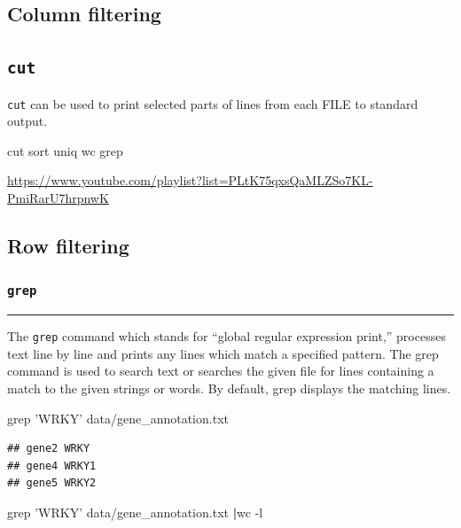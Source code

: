 \documentclass[]{book}
\makeatletter
\newenvironment{Shaded}{\begin{snugshade}}{\end{snugshade}}
\newcommand{\FunctionTok}[1]{\textcolor[rgb]{0.00,0.00,0.00}{#1}}
\newcommand{\KeywordTok}[1]{\textcolor[rgb]{0.13,0.29,0.53}{\textbf{#1}}}
\newcommand{\NormalTok}[1]{#1}
\newcommand{\StringTok}[1]{\textcolor[rgb]{0.31,0.60,0.02}{#1}}
\newenvironment{kframe}{%
\medskip{}
\setlength{\fboxsep}{.8em}
 \def\at@end@of@kframe{}%
 \ifinner\ifhmode%
  \def\at@end@of@kframe{\end{minipage}}%
  \begin{minipage}{\columnwidth}%
 \fi\fi%
 \def\FrameCommand##1{\hskip\@totalleftmargin \hskip-\fboxsep
 \colorbox{shadecolor}{##1}\hskip-\fboxsep
     \hskip-\linewidth \hskip-\@totalleftmargin \hskip\columnwidth}%
 \MakeFramed {\advance\hsize-\width
   \@totalleftmargin\z@ \linewidth\hsize
   \@setminipage}}%
 {\par\unskip\endMakeFramed%
 \at@end@of@kframe}
\renewenvironment{Shaded}{\begin{kframe}}{\end{kframe}}
\makeatother
\begin{document}
\hypertarget{column-filtering}{%
\subsection{Column filtering}\label{column-filtering}}

\hypertarget{cut}{%
\subsection{\texorpdfstring{\texttt{cut}}{cut}}\label{cut}}

\texttt{cut} can be used to print selected parts of lines from each FILE to standard output.

cut sort uniq wc grep

\url{https://www.youtube.com/playlist?list=PLtK75qxsQaMLZSo7KL-PmiRarU7hrpnwK}

\hypertarget{row-filtering}{%
\subsection{Row filtering}\label{row-filtering}}

\hypertarget{grep}{%
\subsubsection{\texorpdfstring{\texttt{grep}}{grep}}\label{grep}}

\begin{center}\rule{0.5\linewidth}{\linethickness}\end{center}

The \texttt{grep} command which stands for ``global regular expression print,'' processes text line by line and prints any lines which match a specified pattern. The grep command is used to search text or searches the given file for lines containing a match to the given strings or words. By default, grep displays the matching lines.

\begin{Shaded}
\begin{Highlighting}[]
\FunctionTok{grep} \StringTok{'WRKY'}\NormalTok{ data/gene_annotation.txt}
\end{Highlighting}
\end{Shaded}

\begin{verbatim}
## gene2 WRKY
## gene4 WRKY1
## gene5 WRKY2
\end{verbatim}

\begin{Shaded}
\begin{Highlighting}[]
\FunctionTok{grep} \StringTok{'WRKY'}\NormalTok{ data/gene_annotation.txt }\KeywordTok{|}\FunctionTok{wc}\NormalTok{ -l }
\end{Highlighting}
\end{Shaded}
\end{document}
